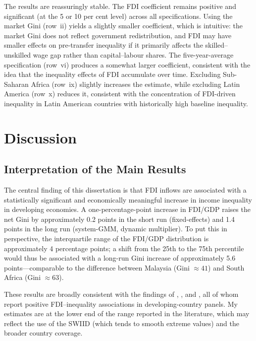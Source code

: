 \documentclass[12pt,a4paper]{article}
\begin{document}
The results are reassuringly stable.  The FDI coefficient remains positive and significant (at the 5 or 10 per cent level) across all specifications.  Using the market Gini (row~ii) yields a slightly smaller coefficient, which is intuitive: the market Gini does not reflect government redistribution, and FDI may have smaller effects on pre-transfer inequality if it primarily affects the skilled--unskilled wage gap rather than capital--labour shares.  The five-year-average specification (row~vi) produces a somewhat larger coefficient, consistent with the idea that the inequality effects of FDI accumulate over time.  Excluding Sub-Saharan Africa (row~ix) slightly increases the estimate, while excluding Latin America (row~x) reduces it, consistent with the concentration of FDI-driven inequality in Latin American countries with historically high baseline inequality.


\section{Discussion}\label{sec:discussion}

\subsection{Interpretation of the Main Results}

The central finding of this dissertation is that FDI inflows are associated with a statistically significant and economically meaningful increase in income inequality in developing economies.  A one-percentage-point increase in FDI/GDP raises the net Gini by approximately 0.2 points in the short run (fixed-effects) and 1.4 points in the long run (system-GMM, dynamic multiplier).  To put this in perspective, the interquartile range of the FDI/GDP distribution is approximately 4 percentage points; a shift from the 25th to the 75th percentile would thus be associated with a long-run Gini increase of approximately 5.6 points---comparable to the difference between Malaysia (Gini $\approx 41$) and South Africa (Gini $\approx 63$).

These results are broadly consistent with the findings of \citet{Figini2011}, \citet{Herzer2012}, and \citet{Jaumotte2013}, all of whom report positive FDI--inequality associations in developing-country panels.  My estimates are at the lower end of the range reported in the literature, which may reflect the use of the SWIID (which tends to smooth extreme values) and the broader country coverage.
\end{document}
